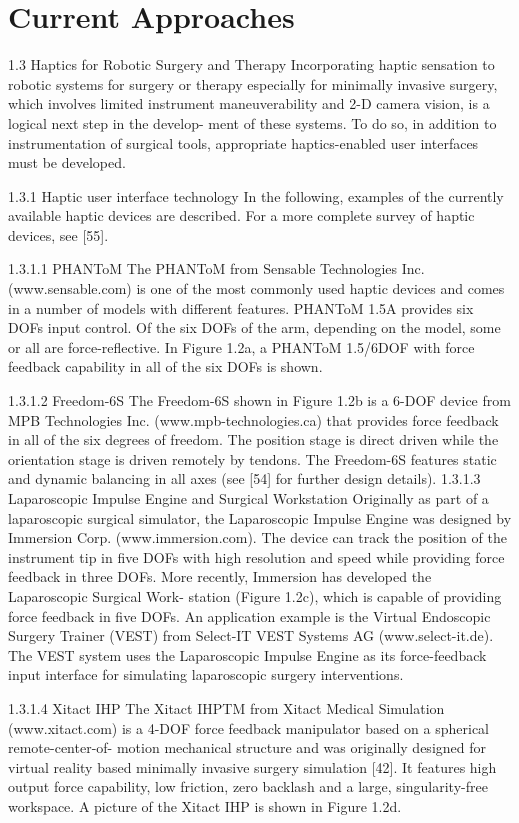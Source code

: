 \section{Current Approaches}
\label{sec:CurAppr}

1.3 Haptics for Robotic Surgery and Therapy 
Incorporating haptic sensation to robotic systems for surgery or therapy especially for minimally invasive surgery, which involves limited instrument maneuverability and 2-D camera vision, is a logical next step in the develop- ment of these systems. To do so, in addition to instrumentation of surgical tools, appropriate haptics-enabled user interfaces must be developed.
 
1.3.1 Haptic user interface technology
In the following, examples of the currently available haptic devices are 
described. For a more complete survey of haptic devices, see [55]. 

1.3.1.1 PHANToM 
The PHANToM from Sensable Technologies Inc. (www.sensable.com) is one of the most commonly used haptic devices and comes in a number of models with different features. PHANToM 1.5A provides six DOFs input control. Of the six DOFs of the arm, depending on the model, some or all are force-reflective. In Figure 1.2a, a PHANToM 1.5/6DOF with force feedback capability in all of the six DOFs is shown. 

1.3.1.2 Freedom-6S 
The Freedom-6S shown in Figure 1.2b is a 6-DOF device from MPB Technologies Inc. (www.mpb-technologies.ca) that provides force feedback in all of the six degrees of freedom. The position stage is direct driven while the orientation stage is driven remotely by tendons. The Freedom-6S features static and dynamic balancing in all axes (see [54] for further design details). 
1.3.1.3 Laparoscopic Impulse Engine and Surgical Workstation 
Originally as part of a laparoscopic surgical simulator, the Laparoscopic Impulse Engine was designed by Immersion Corp. (www.immersion.com). The device can track the position of the instrument tip in five DOFs with high resolution and speed while providing force feedback in three DOFs. More recently, Immersion has developed the Laparoscopic Surgical Work- station (Figure 1.2c), which is capable of providing force feedback in five DOFs. An application example is the Virtual Endoscopic Surgery Trainer (VEST) from Select-IT VEST Systems AG (www.select-it.de). The VEST system uses the Laparoscopic Impulse Engine as its force-feedback input interface for simulating laparoscopic surgery interventions. 

1.3.1.4 Xitact IHP 
The Xitact IHPTM from Xitact Medical Simulation (www.xitact.com) is a 4-DOF force feedback manipulator based on a spherical remote-center-of- motion mechanical structure and was originally designed for virtual reality based minimally invasive surgery simulation [42]. It features high output force capability, low friction, zero backlash and a large, singularity-free workspace. A picture of the Xitact IHP is shown in Figure 1.2d. 




